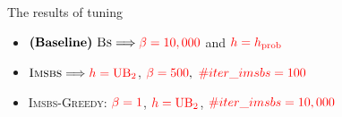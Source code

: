 \documentclass{beamer}
\begin{document}
\begin{frame}{The results of tuning}%
	
	\begin{itemize}
		\item  $ \textbf{\text{(Baseline)}}\ \textsc{Bs} \Longrightarrow  \textcolor{red}{\beta = 10,000}$ and $\textcolor{red}{h = h_{\text{prob}}}$
	    \vspace{0.3cm}
	    \item $ {\textsc{Imsbs}} \Longrightarrow \textcolor{red}{h = \textrm{UB}_2}$,  $\textcolor{red}{\beta = 500},$  $\textcolor{red}{\#iter\_imsbs = 100}$ \\ \vspace{0.3cm}
	    \item {\textsc{Imsbs-Greedy}}:  $\textcolor{red}{\beta=1}$, $\textcolor{red}{h=\text{UB}_2}$,  $\textcolor{red}{\#iter\_imsbs=10,000}$ %
   \end{itemize} 
\end{frame}

	
	
\end{document}
